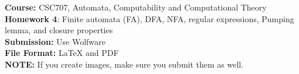 \documentclass{article}%
\begin{document}
\begin{flushleft}
\textbf{Course:} CSC707, Automata, Computability and Computational Theory\\
\textbf{Homework 4}: Finite automata (FA), DFA, NFA, regular expressions, Pumping lemma, and closure properties\\
\textbf{Submission:} Use Wolfware\\
\textbf{File Format:} LaTeX and PDF\\
\textbf{NOTE:} If you create images, make sure you submit them as well.
\end{flushleft}

\begin{center}
\\
\end{center}

\noindent{\hrulefill}

\bigskip
\end{document}
